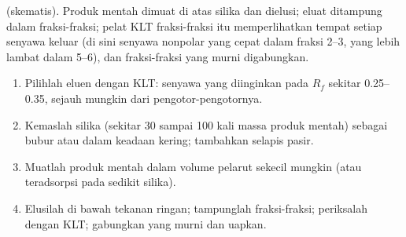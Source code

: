 \begin{omfigure}
\par\vspace{4pt}

{\small {} (skematis). Produk mentah dimuat di atas silika dan
dielusi; eluat ditampung dalam fraksi-fraksi; pelat KLT fraksi-fraksi itu
memperlihatkan tempat setiap senyawa keluar (di sini senyawa nonpolar yang
cepat dalam fraksi 2--3, yang lebih lambat dalam 5--6), dan fraksi-fraksi
yang murni digabungkan.}
\end{omfigure}

\begin{method}\label{met:b2:lab-techniques-2:flash}
\begin{enumerate}
  \item Pilihlah eluen dengan KLT: senyawa yang diinginkan pada $R_f$
        sekitar 0.25--0.35, sejauh mungkin dari pengotor-pengotornya.
  \item Kemaslah silika (sekitar 30 sampai 100 kali massa produk mentah)
        sebagai bubur atau dalam keadaan kering; tambahkan selapis pasir.
  \item Muatlah produk mentah dalam volume pelarut sekecil mungkin (atau
        teradsorpsi pada sedikit silika).
  \item Elusilah di bawah tekanan ringan; tampunglah fraksi-fraksi;
        periksalah dengan KLT; gabungkan yang murni dan uapkan.
\end{enumerate}
\end{method}

